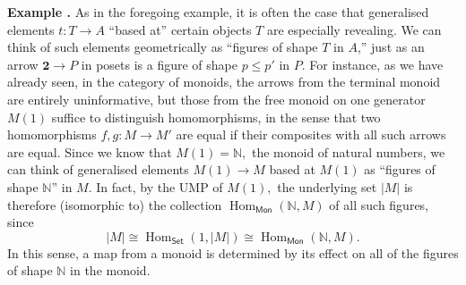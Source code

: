 \documentclass[11pt,leqno,landscape,semhelv]{seminar}
\numberwithin{equation}{section}
\theoremstyle{definition}
\numberwithin{thm}{section}
\numberwithin{equation}{section}
\newcommand{\example}[1]{\refstepcounter{thm}\par\medskip
   {\textbf{Example \thethm.} #1} \rmfamily}
\newcommand{\Hom}{\operatorname{Hom}}
\begin{document}
\example{} As in the foregoing example, it is often the case that generalised elements $t:T\to A$ ``based at'' certain objects $T$ are especially revealing. We can think of such elements geometrically as ``figures of shape $T$ in $A$,'' just as an arrow $\mathbf{2} \to P$ in posets is a figure of shape $p \le p'$ in $P.$ For instance, as we have already seen, in the category of monoids, the arrows from the terminal monoid are entirely uninformative, but those from the free monoid on one generator $M(1)$ suffice to distinguish homomorphisms, in the sense that two homomorphisms $f, g:M \to M'$ are equal if their composites with all such arrows are equal. Since we know that $M(1) = \mathbb{N},$ the monoid of natural numbers, we can think of generalised elements $M(1) \to M$ based at $M(1)$ as ``figures of shape $\mathbb{N}$'' in $M.$ In fact, by the UMP of $M(1),$ the underlying set $|M|$ is therefore (isomorphic to) the collection $\Hom_{\mathsf{Mon}}(\mathbb{N}, M)$ of all such figures, since
\begin{equation*} 
	|M| \cong \Hom_{\mathsf{Set}}(1, |M|) \cong \Hom_{\mathsf{Mon}}(\mathbb{N}, M).
\end{equation*}
In this sense, a map from a monoid is determined by its effect on all of the figures of shape $\mathbb{N}$ in the monoid.
%
%
\end{document}
